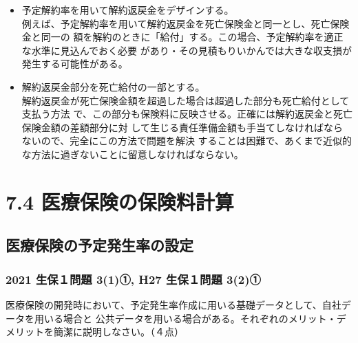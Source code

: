 \documentclass[report,gutter=10mm,fore-edge=10mm,uplatex,dvipdfmx]{jlreq}
\begin{document}
\begin{itemize}
\begin{itemize}
 \item 予定解約率を用いて解約返戻金をデザインする。\\
例えば、予定解約率を用いて解約返戻金を死亡保険金と同一とし、死亡保険金と同一の
額を解約のときに「給付」する。この場合、予定解約率を適正な水準に見込んでおく必要
があり・その見積もりいかんでは大きな収支損が発生する可能性がある。
 \item 解約返戻金部分を死亡給付の一部とする。\\
解約返戻金が死亡保険金額を超過した場合は超過した部分も死亡給付として支払う方法
で、この部分も保険料に反映させる。正確には解約返戻金と死亡保険金額の差額部分に対
して生じる責任準備金額も手当てしなければならないので、完全にこの方法で問題を解決
することは困難で、あくまで近似的な方法に過ぎないことに留意しなければならない。
\end{itemize}
\end{itemize}
\section{7.4 医療保険の保険料計算}
\subsection{医療保険の予定発生率の設定}
\subsubsection{2021 生保１問題 3(1)①, H27 生保１問題 3(2)①}
医療保険の開発時において、予定発生率作成に用いる基礎データとして、自社データを用いる場合と
公共データを用いる場合がある。それぞれのメリット・デメリットを簡潔に説明しなさい。（４点）
\end{document}
